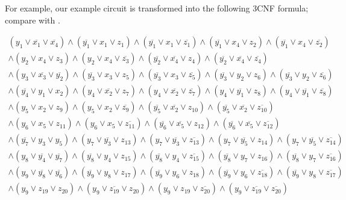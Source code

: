 For example, our example circuit is transformed into the following 3CNF formula; compare with .
\begin{small}
\[
\begin{array}{c}
(y_1 \vee \overline{x_1} \vee \overline{x_4}) \wedge (\overline{y_1} \vee x_1 \vee z_1) \wedge (\overline{y_1} \vee x_1 \vee \overline{z_1}) \wedge (\overline{y_1} \vee x_4 \vee z_2) \wedge (\overline{y_1} \vee x_4 \vee \overline{z_2})\\
\wedge (y_2 \vee x_4 \vee z_3) \wedge (y_2 \vee x_4 \vee \overline{z_3}) \wedge (\overline{y_2} \vee \overline{x_4} \vee z_4) \wedge (\overline{y_2} \vee \overline{x_4} \vee \overline{z_4})\\
\wedge (y_3 \vee \overline{x_3} \vee \overline{y_2}) \wedge (\overline{y_3} \vee x_3 \vee z_5) \wedge (\overline{y_3} \vee x_3 \vee \overline{z_5}) \wedge (\overline{y_3} \vee y_2 \vee z_6) \wedge (\overline{y_3} \vee y_2 \vee \overline{z_6})\\
\wedge (\overline{y_4} \vee y_1 \vee x_2) \wedge (y_4 \vee \overline{x_2} \vee z_7) \wedge (y_4 \vee \overline{x_2} \vee \overline{z_7}) \wedge (y_4 \vee \overline{y_1} \vee z_8) \wedge (y_4 \vee \overline{y_1} \vee \overline{z_8})\\
\wedge (y_5 \vee x_2 \vee z_9) \wedge (y_5 \vee x_2 \vee \overline{z_9}) \wedge (\overline{y_5} \vee \overline{x_2} \vee z_{10}) \wedge (\overline{y_5} \vee \overline{x_2} \vee \overline{z_{10}})\\
\wedge (y_6 \vee x_5 \vee z_{11}) \wedge (y_6 \vee x_5 \vee \overline{z_{11}}) \wedge (\overline{y_6} \vee \overline{x_5} \vee z_{12}) \wedge (\overline{y_6} \vee \overline{x_5} \vee \overline{z_{12}})\\
\wedge (\overline{y_7} \vee y_3 \vee y_5) \wedge (y_7 \vee \overline{y_3} \vee z_{13}) \wedge (y_7 \vee \overline{y_3} \vee \overline{z_{13}}) \wedge (y_7 \vee \overline{y_5} \vee z_{14}) \wedge (y_7 \vee \overline{y_5} \vee \overline{z_{14}})\\
\wedge (y_8 \vee \overline{y_4} \vee \overline{y_7}) \wedge (\overline{y_8} \vee y_4 \vee z_{15}) \wedge (\overline{y_8} \vee y_4 \vee \overline{z_{15}}) \wedge (\overline{y_8} \vee y_7 \vee z_{16}) \wedge (\overline{y_8} \vee y_7 \vee \overline{z_{16}})\\
\wedge (y_9 \vee \overline{y_8} \vee \overline{y_6}) \wedge (\overline{y_9} \vee y_8 \vee z_{17}) \wedge (\overline{y_9} \vee y_6 \vee z_{18}) \wedge (\overline{y_9} \vee y_6 \vee \overline{z_{18}}) \wedge (\overline{y_9} \vee y_8 \vee \overline{z_{17}})\\
\wedge (y_9 \vee z_{19} \vee z_{20}) \wedge (y_9 \vee \overline{z_{19}} \vee z_{20}) \wedge (y_9 \vee z_{19} \vee \overline{z_{20}}) \wedge (y_9 \vee \overline{z_{19}} \vee \overline{z_{20}})
\end{array}
\]
\end{small}
